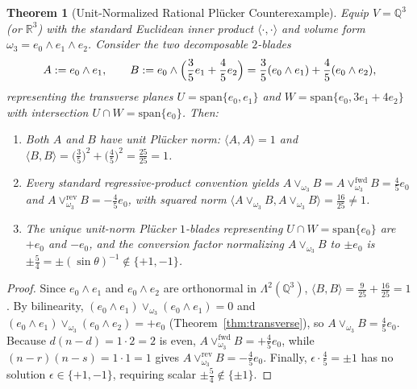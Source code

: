 \documentclass[11pt]{article}
\newtheorem{theorem}{Theorem}[section]
\theoremstyle{definition}
\newcommand{\spn}{\mathrm{span}}
\begin{document}
\begin{theorem}[Unit-Normalized Rational Pl\"ucker Counterexample]\label{thm:r1-unit}
Equip $V = \mathbb{Q}^3$ (or $\mathbb{R}^3$) with the standard Euclidean inner product $\langle \cdot, \cdot \rangle$ and volume form $\omega_3 = e_0 \wedge e_1 \wedge e_2$. Consider the two decomposable $2$-blades
\[
  A := e_0 \wedge e_1, \qquad
  B := e_0 \wedge \Bigl(\frac{3}{5}e_1 + \frac{4}{5}e_2\Bigr) = \frac{3}{5}(e_0 \wedge e_1) + \frac{4}{5}(e_0 \wedge e_2),
\]
representing the transverse planes $U = \spn\{e_0, e_1\}$ and $W = \spn\{e_0, 3e_1 + 4e_2\}$ with intersection $U \cap W = \spn\{e_0\}$. Then:
\begin{enumerate}
  \item Both $A$ and $B$ have unit Pl\"ucker norm: $\langle A, A \rangle = 1$ and $\langle B, B \rangle = \bigl(\frac{3}{5}\bigr)^2 + \bigl(\frac{4}{5}\bigr)^2 = \frac{25}{25} = 1$.
  \item Every standard regressive-product convention yields $A \vee_{\omega_3} B = A \vee_{\omega_3}^{\mathrm{fwd}} B = \frac{4}{5} e_0$ and $A \vee_{\omega_3}^{\mathrm{rev}} B = -\frac{4}{5} e_0$, with squared norm $\langle A \vee_{\omega_3} B, A \vee_{\omega_3} B \rangle = \frac{16}{25} \neq 1$.
  \item The unique unit-norm Pl\"ucker $1$-blades representing $U \cap W = \spn\{e_0\}$ are $+e_0$ and $-e_0$, and the conversion factor normalizing $A \vee_{\omega_3} B$ to $\pm e_0$ is $\pm \frac{5}{4} = \pm (\sin\theta)^{-1} \notin \{+1, -1\}$.
\end{enumerate}
\end{theorem}
\begin{proof}
Since $e_0 \wedge e_1$ and $e_0 \wedge e_2$ are orthonormal in $\Lambda^2(\mathbb{Q}^3)$, $\langle B, B \rangle = \frac{9}{25} + \frac{16}{25} = 1$. By bilinearity, $(e_0 \wedge e_1) \vee_{\omega_3} (e_0 \wedge e_1) = 0$ and $(e_0 \wedge e_1) \vee_{\omega_3} (e_0 \wedge e_2) = +e_0$ (Theorem~\ref{thm:transverse}), so $A \vee_{\omega_3} B = \frac{4}{5} e_0$. Because $d(n-d) = 1 \cdot 2 = 2$ is even, $A \vee_{\omega_3}^{\mathrm{fwd}} B = +\frac{4}{5} e_0$, while $(n-r)(n-s) = 1 \cdot 1 = 1$ gives $A \vee_{\omega_3}^{\mathrm{rev}} B = -\frac{4}{5} e_0$. Finally, $\epsilon \cdot \frac{4}{5} = \pm 1$ has no solution $\epsilon \in \{+1, -1\}$, requiring scalar $\pm \frac{5}{4} \notin \{\pm 1\}$.
\end{proof}
\end{document}
